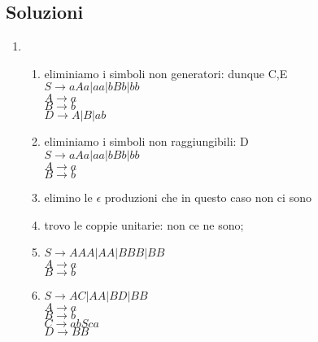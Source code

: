 \documentclass[a4paper,11pt]{article}
\begin{document}
\subsection{Soluzioni}
\begin{enumerate}
    \item \begin{enumerate}
    \item eliminiamo i simboli non generatori: dunque C,E\\
    $S\rightarrow aAa|aa|bBb|bb$\\
    $A\rightarrow a$\\
    $B\rightarrow b$\\
    $D\rightarrow A|B|ab$\\
    \item eliminiamo i simboli non raggiungibili: D\\
    $S\rightarrow aAa|aa|bBb|bb$\\
    $A\rightarrow a$\\
    $B\rightarrow b$\\
    \item elimino le $\epsilon$ produzioni che in questo caso non ci sono
    \item trovo le coppie unitarie: non ce ne sono;
    \item     $S\rightarrow AAA|AA|BBB|BB$\\
    $A\rightarrow a$\\
    $B\rightarrow b$\\
    \item     $S\rightarrow AC|AA|BD|BB$\\
    $A\rightarrow a$\\
    $B\rightarrow b$\\
    $C\rightarrow abSca$\\
    $D\rightarrow BB$\\
    \end{enumerate}
\end{enumerate}
\end{document}
